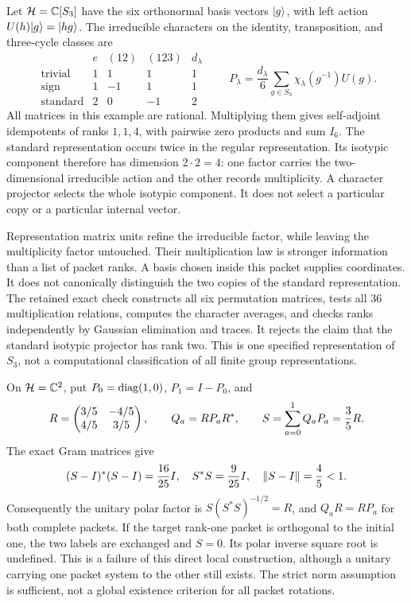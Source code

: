 Let $\mathcal H=\mathbb C[S_3]$ have the six orthonormal basis vectors $\lvert g\rangle$, with left action $U(h)\lvert g\rangle=\lvert hg\rangle$. The irreducible characters on the identity, transposition, and three-cycle classes are
\[
\begin{array}{c|rrr|r}
 & e & (12)&(123)&d_\lambda\\\hline
\text{trivial}&1&1&1&1\\
\text{sign}&1&-1&1&1\\
\text{standard}&2&0&-1&2
\end{array}
\qquad
P_\lambda=\frac{d_\lambda}{6}\sum_{g\in S_3}\chi_\lambda(g^{-1})U(g).
\]
All matrices in this example are rational. Multiplying them gives self-adjoint idempotents of ranks $1,1,4$, with pairwise zero products and sum $I_6$.
The standard representation occurs twice in the regular representation. Its isotypic component therefore has dimension $2\cdot2=4$: one factor carries the two-dimensional irreducible action and the other records multiplicity. A character projector selects the whole isotypic component. It does not select a particular copy or a particular internal vector.

Representation matrix units refine the irreducible factor, while leaving the multiplicity factor untouched. Their multiplication law is stronger information than a list of packet ranks. A basis chosen inside this packet supplies coordinates. It does not canonically distinguish the two copies of the standard representation.
The retained exact check constructs all six permutation matrices, tests all $36$ multiplication relations, computes the character averages, and checks ranks independently by Gaussian elimination and traces. It rejects the claim that the standard isotypic projector has rank two. This is one specified representation of $S_3$, not a computational classification of all finite group representations.

On $\mathcal H=\mathbb C^2$, put $P_0=\operatorname{diag}(1,0)$, $P_1=I-P_0$, and
\[
R=\begin{pmatrix}3/5&-4/5\\4/5&3/5\end{pmatrix},\qquad Q_a=RP_aR^*,
\qquad S=\sum_{a=0}^1Q_aP_a=\frac35R.
\]
The exact Gram matrices give
\[
(S-I)^*(S-I)=\frac{16}{25}I,\quad S^*S=\frac9{25}I,
\quad\left\lVert S-I\right\rVert=\frac45<1.
\]
Consequently the unitary polar factor is $S(S^*S)^{-1/2}=R$, and $Q_aR=RP_a$ for both complete packets.
If the target rank-one packet is orthogonal to the initial one, the two labels are exchanged and $S=0$. Its polar inverse square root is undefined. This is a failure of this direct local construction, although a unitary carrying one packet system to the other still exists. The strict norm assumption is sufficient, not a global existence criterion for all packet rotations.

